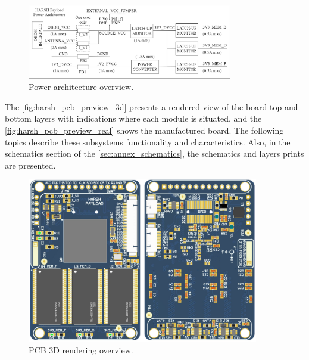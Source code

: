 \begin{figure}[!ht]
    \begin{center}
        \includegraphics[width=0.8\textwidth]{figures/power_architecture.png}
        \caption{Power architecture overview.}
        \label{fig:power_architecture}
    \end{center}
\end{figure}

The \autoref{fig:harsh_pcb_preview_3d} presents a rendered view of the board top and bottom layers with indications where each module is situated, and the \autoref{fig:harsh_pcb_preview_real} shows the manufactured board. The following topics describe these subsystems functionality and characteristics. Also, in the schematics section of the \autoref{sec:annex_schematics}, the schematics and layers prints are presented.

\begin{figure}[!ht]
    \begin{center}
        \includegraphics[width=0.9\textwidth]{figures/harsh_pcb_preview_3d.jpeg}
        \caption{PCB 3D rendering overview.}
        \label{fig:harsh_pcb_preview_3d}
    \end{center}
\end{figure}

